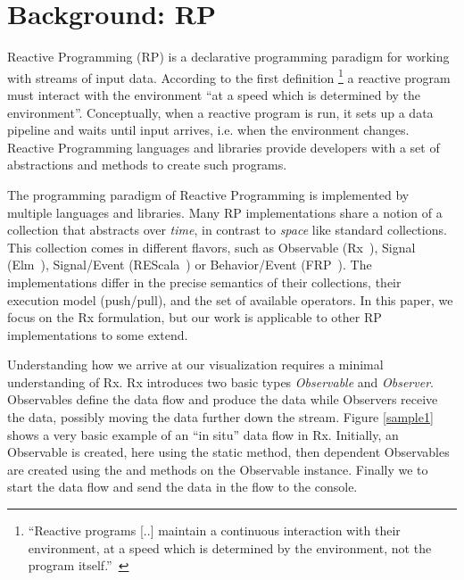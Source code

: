 \section{Background:  RP}%
\label{background}%
\label{nutshell}

Reactive Programming (RP) is a declarative programming paradigm for
working with streams of input data.  According to the first definition%
\footnote{ ``Reactive programs [..] maintain a continuous interaction
with their environment, at a speed which is determined by the
environment, not the program itself.''~\cite{berry1989real} } a reactive
program must interact with the environment ``at a speed which is
determined by the environment''.  Conceptually, when a reactive program
is run, it sets up a data pipeline and waits until input arrives, i.e.
when the environment changes.  Reactive Programming languages and
libraries provide developers with a set of abstractions and methods to
create such programs.

The programming paradigm of Reactive Programming is implemented by
multiple languages and libraries.  Many RP implementations share a
notion of a collection that abstracts over \emph{time}, in contrast to
\emph{space} like standard collections.  This collection comes in
different flavors, such as Observable (Rx~\cite{meijer2010subject}),
Signal (Elm~\cite{czaplicki2012elm}), Signal/Event (REScala~\cite{salvaneschi2014rescala})
or Behavior/Event (FRP~\cite {elliott1997functional}).  The
implementations differ in the precise semantics of their collections,
their execution model (push/pull), and the set of available operators.
In this paper, we focus on the Rx formulation, but our work is
applicable to other RP implementations to some extend.

Understanding how we arrive at our visualization requires a minimal
understanding of Rx.  Rx introduces two basic types \emph{Observable}
and \emph{Observer}.  Observables define the data flow and produce the
data while Observers receive the data, possibly moving the data further
down the stream.  Figure%
\ref{sample1} shows a very basic example of an ``in situ'' data flow in
Rx.  Initially, an Observable is created, here using the static 
method, then dependent Observables are created using the  and
 methods on the Observable instance.  Finally we 
to start the data flow and send the data in the flow to the console.

